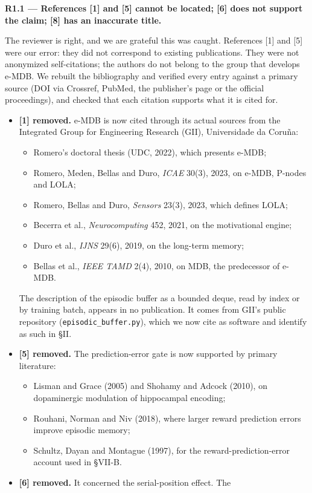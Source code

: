 \documentclass[11pt]{article}
\newcommand{\comment}[1]{\par\medskip\noindent\textbf{#1}\par}
\begin{document}
\comment{R1.1 --- References [1] and [5] cannot be located; [6] does not support the claim; [8] has an inaccurate title.}
The reviewer is right, and we are grateful this was caught. References [1] and
[5] were our error: they did not correspond to existing publications. They were
not anonymized self-citations; the authors do not belong to the group that
develops e-MDB. We rebuilt the bibliography and verified every entry against a
primary source (DOI via Crossref, PubMed, the publisher's page or the official
proceedings), and checked that each citation supports what it is cited for.
\begin{itemize}
\item \textbf{[1] removed.} e-MDB is now cited through its actual sources from
the Integrated Group for Engineering Research (GII), Universidade da Coruña:
\begin{itemize}
\item Romero's doctoral thesis (UDC, 2022), which presents e-MDB;
\item Romero, Meden, Bellas and Duro, \emph{ICAE} 30(3), 2023, on e-MDB, P-nodes and LOLA;
\item Romero, Bellas and Duro, \emph{Sensors} 23(3), 2023, which defines LOLA;
\item Becerra et al., \emph{Neurocomputing} 452, 2021, on the motivational engine;
\item Duro et al., \emph{IJNS} 29(6), 2019, on the long-term memory;
\item Bellas et al., \emph{IEEE TAMD} 2(4), 2010, on MDB, the predecessor of e-MDB.
\end{itemize}
The description of the episodic buffer as a bounded deque, read by index or by
training batch, appears in no publication. It comes from GII's public
repository (\texttt{episodic\_buffer.py}), which we now cite as software and
identify as such in §II.
\item \textbf{[5] removed.} The prediction-error gate is now supported by
primary literature:
\begin{itemize}
\item Lisman and Grace (2005) and Shohamy and Adcock (2010), on dopaminergic modulation of hippocampal encoding;
\item Rouhani, Norman and Niv (2018), where larger reward prediction errors improve episodic memory;
\item Schultz, Dayan and Montague (1997), for the reward-prediction-error account used in §VII-B.
\end{itemize}
\item \textbf{[6] removed.} It concerned the serial-position effect. The

\end{itemize}
\end{document}
